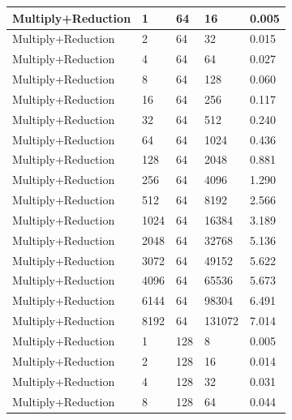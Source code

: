 \documentclass{article}
\begin{document}
\begin{longtable}{|l|l|l|l|l|}
Multiply+Reduction & 1    & 64          & 16                & 0.005             \\ \hline
Multiply+Reduction & 2    & 64          & 32                & 0.015             \\ \hline
Multiply+Reduction & 4    & 64          & 64                & 0.027             \\ \hline
Multiply+Reduction & 8    & 64          & 128               & 0.060             \\ \hline
Multiply+Reduction & 16   & 64          & 256               & 0.117             \\ \hline
Multiply+Reduction & 32   & 64          & 512               & 0.240             \\ \hline
Multiply+Reduction & 64   & 64          & 1024              & 0.436             \\ \hline
Multiply+Reduction & 128  & 64          & 2048              & 0.881             \\ \hline
Multiply+Reduction & 256  & 64          & 4096              & 1.290             \\ \hline
Multiply+Reduction & 512  & 64          & 8192              & 2.566             \\ \hline
Multiply+Reduction & 1024 & 64          & 16384             & 3.189             \\ \hline
Multiply+Reduction & 2048 & 64          & 32768             & 5.136             \\ \hline
Multiply+Reduction & 3072 & 64          & 49152             & 5.622             \\ \hline
Multiply+Reduction & 4096 & 64          & 65536             & 5.673             \\ \hline
Multiply+Reduction & 6144 & 64          & 98304             & 6.491             \\ \hline
Multiply+Reduction & 8192 & 64          & 131072            & 7.014             \\ \hline
Multiply+Reduction & 1    & 128         & 8                 & 0.005             \\ \hline
Multiply+Reduction & 2    & 128         & 16                & 0.014             \\ \hline
Multiply+Reduction & 4    & 128         & 32                & 0.031             \\ \hline
Multiply+Reduction & 8    & 128         & 64                & 0.044             \\ \hline

\end{longtable}
\end{document}
